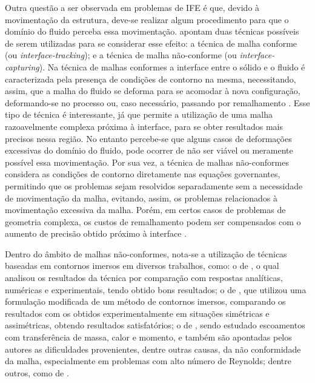 \documentclass[_ArquivoPrincipal.tex]{subfiles}
\begin{document}
Outra questão a ser observada em problemas de IFE é que, devido à movimentação da estrutura, deve-se realizar algum procedimento para que o domínio do fluido perceba essa movimentação.  apontam duas técnicas possíveis de serem utilizadas para se considerar esse efeito: a técnica de malha conforme (ou \textit{interface-tracking}); e a técnica de malha não-conforme (ou \textit{interface-capturing}). Na técnica de malhas conformes a interface entre o sólido e o fluido é caracterizada pela presença de condições de contorno na mesma, necessitando, assim, que a malha do fluido se deforma para se acomodar à nova configuração, deformando-se no processo ou, caso necessário, passando por remalhamento \cite{terahara2020heart}. Esse tipo de técnica é interessante, já que permite a utilização de uma malha razoavelmente complexa próxima à interface, para se obter resultados mais precisos nessa região. No entanto percebe-se que alguns casos de deformações excessivas do domínio do fluido, pode ocorrer de não ser viável ou meramente possível essa movimentação. Por sua vez, a técnica de malhas não-conformes considera as condições de contorno diretamente nas equações governantes, permitindo que os problemas sejam resolvidos separadamente sem a necessidade de movimentação da malha, evitando, assim, os problemas relacionados à movimentação excessiva da malha. Porém, em certos casos de problemas de geometria complexa, os custos de remalhamento podem ser compensados com o aumento de precisão obtido próximo à interface \cite{bazilevs2013computational,hou2012numerical,bazilevs2015ale}.

Dentro do âmbito de malhas não-conformes, nota-se a utilização de técnicas baseadas em contornos imersos em diversos trabalhos, como: o de , o qual analisou os resultados da técnica por comparação com respostas analíticas, numéricas e experimentais, tendo obtido bons resultados; o de , que utilizou uma formulação modificada de um método de contornos imersos, comparando os resultados com os obtidos experimentalmente em situações simétricas e assimétricas, obtendo resultados satisfatórios; o de , sendo estudado escoamentos com transferência de massa, calor e momento, e também são apontadas pelos autores as dificuldades provenientes, dentre outras causas, da não conformidade da malha, especialmente em problemas com alto número de Reynolds; dentre outros, como de .
\end{document}
